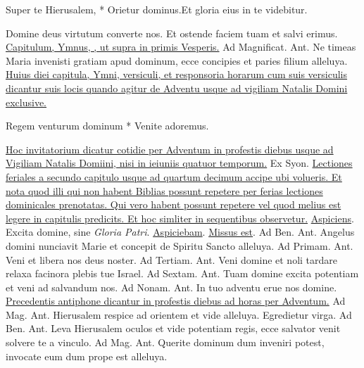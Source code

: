 \begin{multicols*}{2}
\begin{responsory-breve}
{Super te Hierusalem, * Orietur dominus.}{Et gloria eius in te videbitur.}
\end{responsory-breve}
\V Domine deus virtutum converte nos. \R Et ostende faciem tuam et salvi erimus.
 \ul{Capitulum, Ymnus, \Vbar, ut supra in primis Vesperis.} {\color{Red} Ad Magnificat. Ant.} Ne timeas Maria invenisti gratiam apud dominum, ecce concipies et paries filium alleluya. 
\newline \ul{Huius diei capitula, Ymni, versiculi, et responsoria horarum cum suis versiculis dicantur suis locis quando agitur de Adventu usque ad vigiliam Natalis Domini exclusive.}
\begin{invitatory}
{Regem venturum dominum * Venite adoremus.}
\end{invitatory}
\newline \ul{Hoc invitatorium dicatur cotidie per Adventum in profestis diebus usque ad Vigiliam Natalis Domiini, nisi in ieiuniis quatuor temporum.} \V Ex Syon.
\newline \ul{Lectiones feriales a secundo capitulo usque ad quartum decimum accipe ubi volueris. Et nota quod illi qui non habent Biblias possunt repetere per ferias lectiones dominicales prenotatas. Qui vero habent possunt repetere vel quod melius est legere in capitulis predicits. Et hoc simliter in sequentibus observetur.}
\R \hyperlink{aspiciens}{Aspiciens}. \V Excita domine, sine {\itshape Gloria Patri}. \R \hyperlink{aspiciebam}{Aspiciebam}. \R \hyperlink{missus-est}{Missus est}. {\color{Red} Ad Ben. Ant.} Angelus domini nunciavit Marie et concepit de Spiritu Sancto alleluya. {\color{Red} Ad Primam. Ant.} Veni et libera nos deus noster. {\color{Red} Ad Tertiam. Ant.} Veni domine et noli tardare relaxa facinora plebis tue Israel. {\color{Red} Ad Sextam. Ant.} Tuam domine excita potentiam et veni ad salvandum nos. {\color{Red} Ad Nonam. Ant.} In tuo adventu erue nos domine.
\newline \ul{Precedentis antiphone dicantur in profestis diebus ad horas per Adventum.} {\color{Red} Ad Mag. Ant.} Hierusalem respice ad orientem et vide alleluya.
 \V Egredietur virga. {\color{Red} Ad Ben. Ant.} Leva Hierusalem oculos et vide potentiam regis, ecce salvator venit solvere te a vinculo. {\color{Red} Ad Mag. Ant.} Querite dominum dum inveniri potest, invocate eum dum prope est alleluya.

\end{multicols*}
